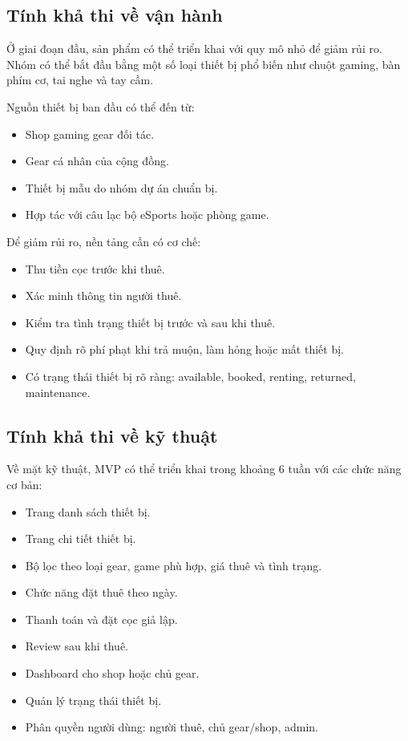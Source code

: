 \subsection{Tính khả thi về vận hành}

Ở giai đoạn đầu, sản phẩm có thể triển khai với quy mô nhỏ để giảm rủi ro. Nhóm có thể bắt đầu bằng một số loại thiết bị phổ biến như chuột gaming, bàn phím cơ, tai nghe và tay cầm.

Nguồn thiết bị ban đầu có thể đến từ:

\begin{itemize}
    \item Shop gaming gear đối tác.
    \item Gear cá nhân của cộng đồng.
    \item Thiết bị mẫu do nhóm dự án chuẩn bị.
    \item Hợp tác với câu lạc bộ eSports hoặc phòng game.
\end{itemize}

Để giảm rủi ro, nền tảng cần có cơ chế:

\begin{itemize}
    \item Thu tiền cọc trước khi thuê.
    \item Xác minh thông tin người thuê.
    \item Kiểm tra tình trạng thiết bị trước và sau khi thuê.
    \item Quy định rõ phí phạt khi trả muộn, làm hỏng hoặc mất thiết bị.
    \item Có trạng thái thiết bị rõ ràng: available, booked, renting, returned, maintenance.
\end{itemize}

\subsection{Tính khả thi về kỹ thuật}

Về mặt kỹ thuật, MVP có thể triển khai trong khoảng 6 tuần với các chức năng cơ bản:

\begin{itemize}
    \item Trang danh sách thiết bị.
    \item Trang chi tiết thiết bị.
    \item Bộ lọc theo loại gear, game phù hợp, giá thuê và tình trạng.
    \item Chức năng đặt thuê theo ngày.
    \item Thanh toán và đặt cọc giả lập.
    \item Review sau khi thuê.
    \item Dashboard cho shop hoặc chủ gear.
    \item Quản lý trạng thái thiết bị.
    \item Phân quyền người dùng: người thuê, chủ gear/shop, admin.
\end{itemize}

